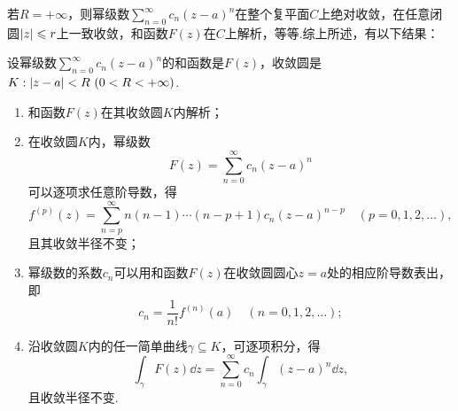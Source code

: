 若\(R=+\infty\)，则幂级数\(\sum\limits_{n=0}^{\infty} c_n (z-a)^n\)在整个复平面\(C\)上绝对收敛，在任意闭圆\(\abs{z} \leqslant r\)上一致收敛，和函数\(F(z)\)在\(C\)上解析，等等.综上所述，有以下结果：
\begin{theorem}\label{theorem:解析函数的级数表示.幂级数的和函数的性质}
设幂级数\(\sum\limits_{n=0}^{\infty} c_n (z-a)^n\)的和函数是\(F(z)\)，收敛圆是\(K: \abs{z-a}<R\ (0<R<+\infty)\).\begin{enumerate}
\item 和函数\(F(z)\)在其收敛圆\(K\)内解析；

\item 在收敛圆\(K\)内，幂级数\[
F(z) = \sum\limits_{n=0}^{\infty} c_n (z-a)^n
\]可以逐项求任意阶导数，得\begin{equation}
f^{(p)}(z) = \sum\limits_{n=p}^{\infty} n(n-1)\dotsm(n-p+1) c_n (z-a)^{n-p}
\quad(p=0,1,2,\dotsc),
\end{equation}且其收敛半径不变；

\item 幂级数的系数\(c_n\)可以用和函数\(F(z)\)在收敛圆圆心\(z=a\)处的相应阶导数表出，即\begin{equation}
c_n = \frac{1}{n!} f^{(n)}(a)
\quad(n=0,1,2,\dotsc);
\end{equation}

\item 沿收敛圆\(K\)内的任一简单曲线\(\gamma \subseteq K\)，可逐项积分，得\begin{equation}
\int_{\gamma} F(z) \dd{z}
= \sum\limits_{n=0}^{\infty} c_n \int_{\gamma} (z-a)^n \dd{z},
\end{equation}且收敛半径不变.
\end{enumerate}
\end{theorem}

